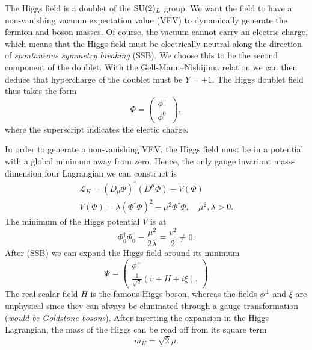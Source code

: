 The Higgs field is a doublet of the $\mathrm{SU}(2)_L$ group. We want the field to have a non-vanishing vacuum expectation value (\acs{VEV}) to dynamically generate the fermion and boson masses. Of course, the vacuum cannot carry an electric charge, which means that the Higgs field must be electrically neutral along the direction of \textit{spontaneous symmetry breaking} (\acs{SSB}). We choose this to be the second component of the doublet. With the Gell-Mann--Nishijima relation we can then deduce that hypercharge of the doublet must be $Y = +1$. The Higgs doublet field thus takes the form
\begin{equation}
\Phi = \begin{pmatrix}
  \phi^+ \\
  \phi^0
\end{pmatrix},
\end{equation}
where the superscript indicates the electic charge.

In order to generate a non-vanishing \acs{VEV}, the Higgs field must be in a potential with a global minimum away from zero. Hence, the only gauge invariant mass-dimension four Lagrangian we can construct is
\begin{equation}
\begin{gathered}
\mathcal{L}_H = \left( D_\mu \Phi \right)^\dagger \left( D^\mu \Phi \right) - V(\Phi) \\
V(\Phi) = \lambda (\Phi^\dagger \Phi )^2 - \mu^2 \Phi^\dagger \Phi, \quad \mu^2, \lambda > 0.
\end{gathered}
\label{eq:2:Higgs_Lagrangian}
\end{equation}
The minimum of the Higgs potential $V$ is at
\begin{equation}
\Phi_0^\dagger \Phi_0 = \frac{\mu^2}{2 \lambda} \equiv \frac{v^2}{2} \neq 0.
\end{equation}
After (\acs{SSB}) we can expand the Higgs field around its minimum
\begin{equation}
\Phi = \begin{pmatrix}
  \phi^+ \\
  \frac{1}{\sqrt{2}} ( v + H + i \xi ).
\end{pmatrix}
\end{equation}
The real scalar field $H$ is the famous Higgs boson, whereas the fields $\phi^\pm$ and $\xi$ are unphysical since they can always be eliminated through a gauge transformation (\textit{would-be Goldstone bosons}). After inserting the expansion in the Higgs Lagrangian, the mass of the Higgs can be read off from its square term
\begin{equation}
m_H = \sqrt{2} \mu.
\end{equation}

